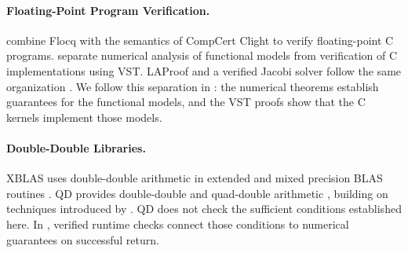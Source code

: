 \paragraph{Floating-Point Program Verification.}
\citet{Ramananandro2016} combine Flocq with the semantics of
CompCert Clight to verify floating-point C programs.
\citet{AppelBertot2020} separate numerical analysis of
functional models from verification of C implementations
using VST. LAProof and a verified Jacobi solver follow the
same organization
\citep{Kellison2023LAProof,Tekriwal2023Jacobi}.
We follow this separation in \FenceDD{}: the numerical theorems
establish guarantees for the functional models, and the VST
proofs show that the C kernels implement those models.

\paragraph{Double-Double Libraries.}
XBLAS uses double-double arithmetic in extended and mixed
precision BLAS routines \citep{Li2002}. QD provides
double-double and quad-double arithmetic \citep{Hida2001,QD},
building on techniques introduced by \citet{Dekker1971}.
QD does not check the sufficient conditions established here.
In \FenceDD{}, verified runtime checks connect those
conditions to numerical guarantees on successful return.
